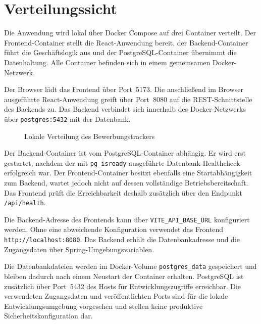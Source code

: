\documentclass[a4paper,11pt]{article}
\begin{document}

\newpage
\section{Verteilungssicht}
\label{sec:deployment-view}

Die Anwendung wird lokal über Docker Compose auf drei Container verteilt.
Der Frontend-Container stellt die React-Anwendung bereit, der Backend-Container führt die Geschäftslogik aus und der PostgreSQL-Container übernimmt die Datenhaltung.
Alle Container befinden sich in einem gemeinsamen Docker-Netzwerk.

Der Browser lädt das Frontend über Port~5173.
Die anschließend im Browser ausgeführte React-Anwendung greift über Port~8080 auf die REST-Schnittstelle des Backends zu.
Das Backend verbindet sich innerhalb des Docker-Netzwerks über \texttt{postgres:5432} mit der Datenbank.

\vspace{0.4cm}

\begin{figure}[H]
\centering
\resizebox{\textwidth}{!}{
  
}
\caption{Lokale Verteilung des Bewerbungstrackers}
\label{fig:deployment}
\end{figure}

Der Backend-Container ist vom PostgreSQL-Container abhängig.
Er wird erst gestartet, nachdem der mit \texttt{pg\_isready} ausgeführte Datenbank-Healthcheck erfolgreich war.
Der Frontend-Container besitzt ebenfalls eine Startabhängigkeit zum Backend, wartet jedoch nicht auf dessen vollständige Betriebsbereitschaft.
Das Frontend prüft die Erreichbarkeit deshalb zusätzlich über den Endpunkt \texttt{/api/health}.

Die Backend-Adresse des Frontends kann über \texttt{VITE\_API\_BASE\_URL} konfiguriert werden.
Ohne eine abweichende Konfiguration verwendet das Frontend \texttt{http://localhost:8080}.
Das Backend erhält die Datenbankadresse und die Zugangsdaten über Spring-Umgebungsvariablen.

Die Datenbankdateien werden im Docker-Volume \texttt{postgres\_data} gespeichert und bleiben dadurch nach einem Neustart der Container erhalten.
PostgreSQL ist zusätzlich über Port~5432 des Hosts für Entwicklungszugriffe erreichbar.
Die verwendeten Zugangsdaten und veröffentlichten Ports sind für die lokale Entwicklungsumgebung vorgesehen und stellen keine produktive Sicherheitskonfiguration dar.
\end{document}
